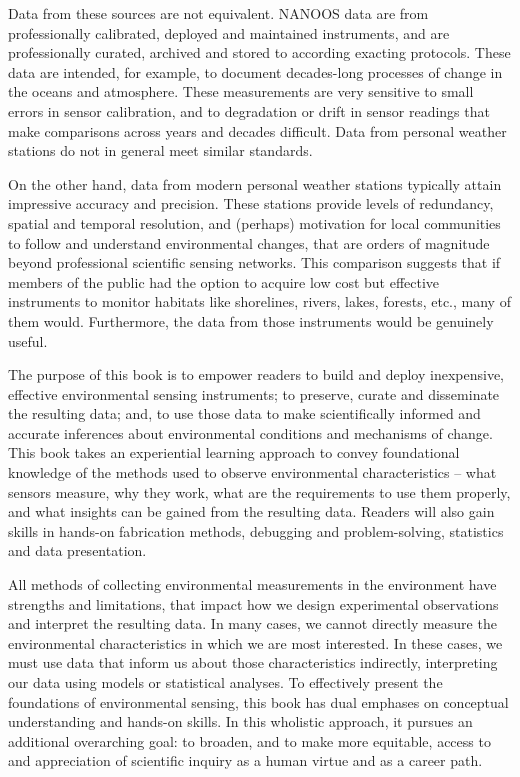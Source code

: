 Data from these sources are not equivalent.
NANOOS data are from professionally calibrated, deployed and maintained instruments, and are professionally curated, archived and stored to according exacting protocols. 
These data are intended, for example, to document decades-long processes of change in the oceans and atmosphere. 
These measurements are very sensitive to small errors in sensor calibration, and to degradation or drift in sensor readings that make comparisons across years and decades difficult.
Data from personal weather stations do not in general meet similar standards. 

On the other hand, data from modern personal weather stations typically attain impressive accuracy and precision.
These stations provide levels of redundancy, spatial and temporal resolution, and (perhaps) motivation for local communities to follow and understand environmental changes, that are orders of magnitude beyond professional scientific sensing networks. 
This comparison suggests that if members of the public had the option to acquire low cost but effective instruments to monitor habitats like shorelines, rivers, lakes, forests, etc., many of them would. 
Furthermore, the data from those instruments would be genuinely useful.

The purpose of this book is to empower readers to build and deploy inexpensive, effective environmental sensing instruments; to preserve, curate and disseminate the resulting data; and, to use those data to make scientifically informed and accurate inferences about environmental conditions and mechanisms of change. 
This book takes an experiential learning approach to convey foundational knowledge of the methods used to observe environmental characteristics -- what sensors measure, why they work, what are the requirements to use them properly, and what insights can be gained from the resulting data.
Readers will also gain skills in hands-on fabrication methods, debugging and problem-solving, statistics and data presentation.

All methods of collecting environmental measurements in the environment have strengths and limitations, that impact how we design experimental observations and interpret the resulting data. 
In many cases, we cannot directly measure the environmental characteristics in which we are most interested. 
In these cases, we must use data that inform us about those characteristics indirectly, interpreting our data using models or statistical analyses. 
To effectively present the foundations of environmental sensing, this book has dual emphases on conceptual understanding and 
hands-on skills.
In this wholistic approach, it pursues an additional overarching goal: to broaden, and to make more equitable, access to and appreciation of scientific inquiry as a human virtue and as a career path.

